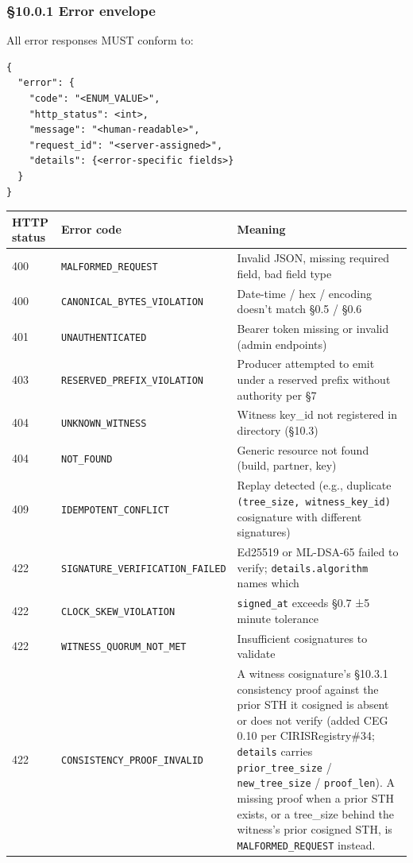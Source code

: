 \documentclass[10pt]{article}
\begin{document}
\subsubsection*{§10.0.1 Error envelope}


All error responses MUST conform to:


\begin{lstlisting}
{
  "error": {
    "code": "<ENUM_VALUE>",
    "http_status": <int>,
    "message": "<human-readable>",
    "request_id": "<server-assigned>",
    "details": {<error-specific fields>}
  }
}
\end{lstlisting}

{\footnotesize
\begin{longtable}{|p{5.33cm}|p{5.33cm}|p{5.33cm}|}\hline
\textbf{HTTP status} & \textbf{Error code} & \textbf{Meaning} \\ \hline\endhead
400 & \texttt{MALFORMED\_REQUEST} & Invalid JSON, missing required field, bad field type \\ \hline
400 & \texttt{CANONICAL\_BYTES\_VIOLATION} & Date-time / hex / encoding doesn't match §0.5 / §0.6 \\ \hline
401 & \texttt{UNAUTHENTICATED} & Bearer token missing or invalid (admin endpoints) \\ \hline
403 & \texttt{RESERVED\_PREFIX\_VIOLATION} & Producer attempted to emit under a reserved prefix without authority per §7 \\ \hline
404 & \texttt{UNKNOWN\_WITNESS} & Witness key\_id not registered in directory (§10.3) \\ \hline
404 & \texttt{NOT\_FOUND} & Generic resource not found (build, partner, key) \\ \hline
409 & \texttt{IDEMPOTENT\_CONFLICT} & Replay detected (e.g., duplicate \texttt{(tree\_size, witness\_key\_id)} cosignature with different signatures) \\ \hline
422 & \texttt{SIGNATURE\_VERIFICATION\_FAILED} & Ed25519 or ML-DSA-65 failed to verify; \texttt{details.algorithm} names which \\ \hline
422 & \texttt{CLOCK\_SKEW\_VIOLATION} & \texttt{signed\_at} exceeds §0.7 ±5 minute tolerance \\ \hline
422 & \texttt{WITNESS\_QUORUM\_NOT\_MET} & Insufficient cosignatures to validate \\ \hline
422 & \texttt{CONSISTENCY\_PROOF\_INVALID} & A witness cosignature's §10.3.1 consistency proof against the prior STH it cosigned is absent or does not verify (added CEG 0.10 per CIRISRegistry\#34; \texttt{details} carries \texttt{prior\_tree\_size} / \texttt{new\_tree\_size} / \texttt{proof\_len}). A missing proof when a prior STH exists, or a tree\_size behind the witness's prior cosigned STH, is \texttt{MALFORMED\_REQUEST} instead. \\ \hline

\end{longtable}}
\end{document}
